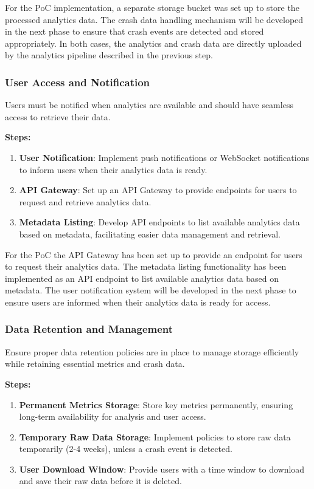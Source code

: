 For the PoC implementation, a separate storage bucket was set up to store the processed analytics data. The crash data handling mechanism will be developed in the next phase to ensure that crash events are detected and stored appropriately.
In both cases, the analytics and crash data are directly uploaded by the analytics pipeline described in the previous step.

\subsubsection{User Access and Notification}
Users must be notified when analytics are available and should have seamless access to retrieve their data.

\textbf{Steps:}
\begin{enumerate}
    \item \textbf{User Notification}: Implement push notifications or WebSocket notifications to inform users when their analytics data is ready.
    \item \textbf{API Gateway}: Set up an API Gateway to provide endpoints for users to request and retrieve analytics data.
    \item \textbf{Metadata Listing}: Develop API endpoints to list available analytics data based on metadata, facilitating easier data management and retrieval.
\end{enumerate}

For the PoC the API Gateway has been set up to provide an endpoint for users to request their analytics data. The metadata listing functionality has been implemented as an API endpoint to list available analytics data based on metadata. The user notification system will be developed in the next phase to ensure users are informed when their analytics data is ready for access.

\subsubsection{Data Retention and Management}
Ensure proper data retention policies are in place to manage storage efficiently while retaining essential metrics and crash data.

\textbf{Steps:}
\begin{enumerate}
    \item \textbf{Permanent Metrics Storage}: Store key metrics permanently, ensuring long-term availability for analysis and user access.
    \item \textbf{Temporary Raw Data Storage}: Implement policies to store raw data temporarily (2-4 weeks), unless a crash event is detected.
    \item \textbf{User Download Window}: Provide users with a time window to download and save their raw data before it is deleted.
\end{enumerate}

